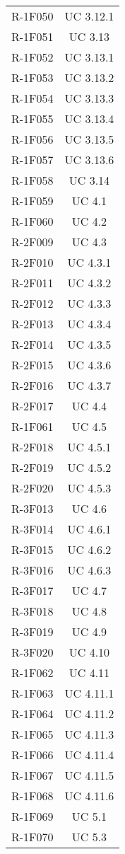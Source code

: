 \begin{tabularx}{\textwidth}{c|c}
		R-1F050 & UC 3.12.1 \\
		R-1F051 & UC 3.13 \\
		R-1F052 & UC 3.13.1 \\
		R-1F053 & UC 3.13.2 \\
		R-1F054 & UC 3.13.3 \\
		R-1F055 & UC 3.13.4 \\
		R-1F056 & UC 3.13.5 \\
		R-1F057 & UC 3.13.6 \\
		R-1F058 & UC 3.14 \\
		R-1F059 & UC 4.1 \\
		R-1F060 & UC 4.2 \\
		R-2F009 & UC 4.3 \\
		R-2F010 & UC 4.3.1 \\
		R-2F011 & UC 4.3.2 \\
		R-2F012 & UC 4.3.3 \\
		R-2F013 & UC 4.3.4 \\
		R-2F014 & UC 4.3.5 \\
		R-2F015 & UC 4.3.6 \\
		R-2F016 & UC 4.3.7 \\
		R-2F017 & UC 4.4 \\
		R-1F061 & UC 4.5 \\
		R-2F018 & UC 4.5.1 \\
		R-2F019 & UC 4.5.2 \\
		R-2F020 & UC 4.5.3 \\
		R-3F013 & UC 4.6 \\
		R-3F014 & UC 4.6.1 \\
		R-3F015 & UC 4.6.2 \\
		R-3F016 & UC 4.6.3 \\
		R-3F017 & UC 4.7 \\
		R-3F018 & UC 4.8 \\
		R-3F019 & UC 4.9 \\
		R-3F020 & UC 4.10 \\
		R-1F062 & UC 4.11 \\
		R-1F063 & UC 4.11.1 \\
		R-1F064 & UC 4.11.2 \\
		R-1F065 & UC 4.11.3 \\
		R-1F066 & UC 4.11.4 \\
		R-1F067 & UC 4.11.5 \\
		R-1F068 & UC 4.11.6 \\
		R-1F069 & UC 5.1 \\
		R-1F070 & UC 5.3 \\

\end{tabularx}

